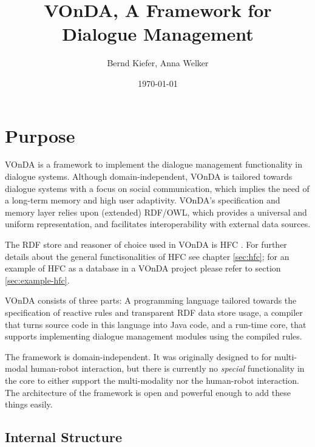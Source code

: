 \documentclass[a4paper]{report}
\newcommand{\vonda}{VOnDA\xspace}
\begin{document}
\title{\vonda, A Framework for Dialogue Management}

\author{Bernd Kiefer, Anna Welker}
\date{\today}

\maketitle

\tableofcontents

\chapter{Purpose}

\vonda is a framework to implement the dialogue management functionality in
dialogue systems. Although domain-independent, \vonda is tailored towards
dialogue systems with a focus on social communication, which implies the need
of a long-term memory and high user adaptivity. \vonda's specification and
memory layer relies upon (extended) RDF/OWL, which provides a universal and
uniform representation, and facilitates interoperability with external data
sources.

The RDF store and reasoner of choice used in \vonda is HFC
\citep{krieger2013efficient}. For further details about the general
functisonalities of HFC see chapter \ref{sec:hfc}; for an example of HFC as a
database in a \vonda project please refer to section \ref{sec:example-hfc}.

\vonda consists of three parts: A programming language tailored towards the
specification of reactive rules and transparent RDF data store usage, a
compiler that turns source code in this language into Java code, and a run-time
core, that supports implementing dialogue management modules using the compiled
rules.

The framework is domain-independent. It was originally designed to for
multi-modal human-robot interaction, but there is currently no \emph{special}
functionality in the core to either support the multi-modality nor the
human-robot interaction. The architecture of the framework is open and powerful
enough to add these things easily.


\section{Internal Structure}
\end{document}

